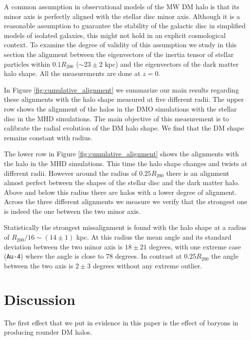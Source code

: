\documentclass[usenatbib]{mnras}
\begin{document}
A common assumption in observational models of the MW DM halo is that
its minor axis is perfectly aligned with the stellar disc minor axis.
Although it is a reasonable assumption to guarantee the stability of
the galactic disc in simplified models of isolated galaxies, this
might not hold in an explicit cosmological context. 
To examine the degree of validity of this assumption we study in this
section the alignment between the eigenvectors of the inertia tensor of
stellar particles within $0.1R_{200}$ ($\sim 23\pm 2$ kpc) and the
eigenvectors of the dark matter halo shape.
All the measurements are done at $z=0$.

In Figure \ref{fig:cumulative_alignment} we summarize our main results
regarding these alignments with the halo shape measured at five
different radii.
The upper row shows the alignment of the halos in the DMO simulations
with the stellar disc in the MHD simulations.
The main objective of this measurement is to calibrate the radial
evolution of the DM halo shape. 
We find that the DM shape remains constant with radius.

The lower row in Figure \ref{fig:cumulative_alignment} shows the
alignments with the halo in the MHD simulations. 
This time the halo shape changes and twists at different radii.
However around the radius of $0.25R_{200}$ there is an alignment
almost perfect between the shapes of the stellar disc and the dark
matter halo. 
Above and below this radius there are halos with a lower degree of
alignment.
Across the three different alignments we measure we verify that the
strongest one is indeed the one between the two minor axis.

Statistically the strongest missalignment is found with the halo shape
at a radius of $R_{200}/16\sim (14\pm1)$ kpc. 
At this radius the mean angle and its standard deviation between the
two minor axis is $18 \pm 21$ degrees, with one extreme case
(\texttt{Au-4}) where the angle is close to $78$ degrees. 
In contrast at $0.25 R_{200}$ the angle between the two axis is
$2\pm 3$ degrees without any extreme outlier.





\section{Discussion}
\label{sec:discussion}

The first effect that we put in evidence in this paper is the effect
of baryons in producing rounder DM halos.
\end{document}
